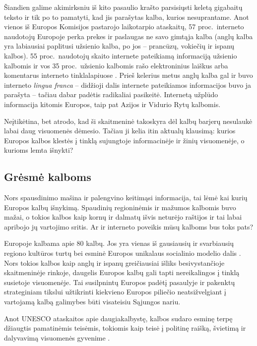 \begin{multicols}{2}
Šiandien galime akimirksniu iš kito pasaulio krašto parsisiųsti keletą gigabaitų teksto ir tik po to pamatyti, kad jis parašytas kalba, kurios nesuprantame. Anot vienos iš Europos Komisijos pastarojo laikotarpio ataskaitų, 57 proc.~interneto naudotojų Europoje perka prekes ir paslaugas ne savo gimtąja kalba (anglų kalba yra labiausiai paplitusi užsienio kalba, po jos – prancūzų, vokiečių ir ispanų kalbos). 55 proc.~naudotojų skaito internete pateikiamą informaciją užsienio kalbomis ir vos 35 proc.~užsienio kalbomis rašo elektroninius laiškus arba komentarus interneto tinklalapiuose \cite{EC1}.  Prieš kelerius metus anglų kalba gal ir buvo interneto \textit{lingua franca}  – didžioji dalis internete pateikiamos informacijos buvo ja parašyta – tačiau dabar padėtis radikaliai pasikeitė. Internetą užplūdo informacija kitomis Europos, taip pat Azijos ir Vidurio Rytų kalbomis. 

Neįtikėtina, bet atrodo, kad ši skaitmeninė takoskyra dėl kalbų barjerų nesulaukė labai daug visuomenės dėmesio. Tačiau ji kelia itin aktualų klausimą: kurios Europos kalbos klestės į tinklą sujungtoje informacinėje ir žinių visuomenėje, o kurioms lemta išnykti?

\subsection{Grėsmė kalboms }

Nors spausdinimo mašina ir palengvino keitimąsi informacija, tai lėmė kai kurių Europos kalbų išnykimą. Spaudinių regioninėmis ir mažumos kalbomis buvo mažai, o tokios kalbos kaip kornų ir dalmatų išvis neturėjo raštijos ir tai labai apribojo  jų vartojimo sritis. Ar ir interneto poveikis mūsų kalboms bus toks pats?

Europoje kalbama apie 80 kalbų. Jos yra vienas iš gausiausių ir svarbiausių  regiono kultūros turtų bei esminė Europos unikalaus socialinio modelio dalis \cite{EC2}.  Nors tokios kalbos kaip anglų ir ispanų greičiausiai išliks besivystančioje skaitmeninėje rinkoje, daugelis Europos kalbų gali tapti nereikalingos į tinklą susietoje visuomenėje. Tai susilpnintų Europos padėtį pasaulyje ir pakenktų strateginiam tikslui užtikrinti kiekvieno Europos piliečio neatsižvelgiant į vartojamą kalbą galimybes būti visateisiu Sąjungos nariu.  


Anot UNESCO ataskaitos apie daugiakalbystę, kalbos sudaro esminę terpę džiaugtis pamatinėmis teisėmis, tokiomis kaip teisė į politinę raišką, švietimą ir dalyvavimą visuomenės gyvenime \cite{Unesco1}.


\end{multicols}
